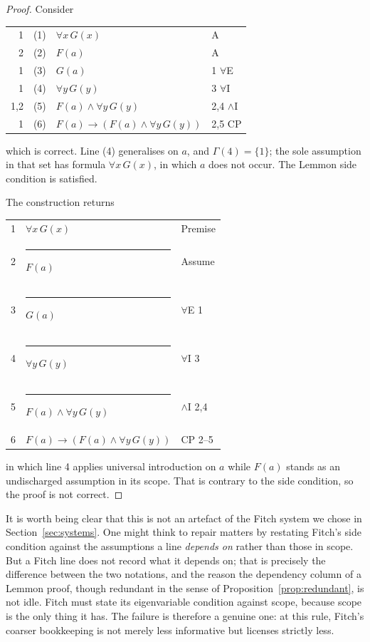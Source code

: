 \documentclass[11pt]{article}
\makeatletter
\theoremstyle{plain}
\theoremstyle{definition}
\theoremstyle{remark}
\newcommand{\fbar}{\rule[-0.7ex]{0.4pt}{2.6ex}\hspace{0.7em}}
\newcommand{\dep}[1]{\textup{#1}}
\newenvironment{lemmonproof}
  {\begin{center}\begin{tabular}{@{}r@{\hspace{1.5em}}r@{\hspace{0.6em}}l@{\hspace{2.5em}}l@{}}}
  {\end{tabular}\end{center}}
\newenvironment{fitchproof}
  {\begin{center}\begin{tabular}{@{}r@{\hspace{1em}}l@{\hspace{2.5em}}l@{}}}
  {\end{tabular}\end{center}}
\makeatother
\begin{document}
\begin{proof}
Consider

\begin{lemmonproof}
\dep{1}   & (1) & $\forall x\, G(x)$ & A \\
\dep{2}   & (2) & $F(a)$             & A \\
\dep{1}   & (3) & $G(a)$             & 1 $\forall$E \\
\dep{1}   & (4) & $\forall y\, G(y)$ & 3 $\forall$I \\
\dep{1,2} & (5) & $F(a) \wedge \forall y\, G(y)$ & 2,4 $\wedge$I \\
\dep{1}   & (6) & $F(a) \to (F(a) \wedge \forall y\, G(y))$ & 2,5 CP \\
\end{lemmonproof}

\noindent which is correct. Line (4) generalises on $a$, and $\Gamma(4) =
\{1\}$; the sole assumption in that set has formula $\forall x\, G(x)$, in
which $a$ does not occur. The Lemmon side condition is satisfied.

The construction returns

\begin{fitchproof}
1 &                 $\forall x\, G(x)$ & Premise \\
2 & \fbar           $F(a)$             & Assume \\
3 & \fbar           $G(a)$             & $\forall$E 1 \\
4 & \fbar           $\forall y\, G(y)$ & $\forall$I 3 \\
5 & \fbar           $F(a) \wedge \forall y\, G(y)$ & $\wedge$I 2,4 \\
6 &                 $F(a) \to (F(a) \wedge \forall y\, G(y))$ & CP 2--5 \\
\end{fitchproof}

\noindent in which line 4 applies universal introduction on $a$ while $F(a)$
stands as an undischarged assumption in its scope. That is contrary to the
side condition, so the proof is not correct.
\end{proof}

It is worth being clear that this is not an artefact of the Fitch system we
chose in Section~\ref{sec:systems}. One might think to repair matters by
restating Fitch's side condition against the assumptions a line
\emph{depends on} rather than those in scope. But a Fitch line does not
record what it depends on; that is precisely the difference between the two
notations, and the reason the dependency column of a Lemmon proof, though
redundant in the sense of Proposition~\ref{prop:redundant}, is not idle.
Fitch must state its eigenvariable condition against scope, because scope is
the only thing it has. The failure is therefore a genuine one: at this rule,
Fitch's coarser bookkeeping is not merely less informative but licenses
strictly less.
\end{document}
